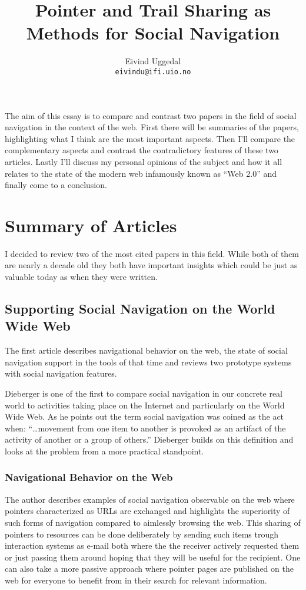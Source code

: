 \documentclass[12pt,a4paper]{article}
\title{Pointer and Trail Sharing as Methods for Social Navigation}
\author{Eivind Uggedal\\
  \texttt{eivindu@ifi.uio.no}}
\date{}
\begin{document}
\maketitle{}


The aim of this essay is to compare and contrast two papers in the field of
social navigation in the context of the web. First there will be summaries
of the papers, highlighting what I think are the most important aspects.
Then I'll compare the complementary aspects and contrast the contradictory
features of these two articles. Lastly I'll discuss my personal
opinions of the subject and how it all relates to the state of the modern web
infamously known as ``Web 2.0'' and finally come to a conclusion.

\section{Summary of Articles}

I decided to review two of the most cited papers in this field. While both of
them are nearly a decade old they both have important insights which could be
just as valuable today as when they were written.

\subsection{Supporting Social Navigation on the World Wide Web}
The first article \cite{dieberger97} describes navigational behavior on the
web, the state of social navigation support in the tools of that time and
reviews two prototype systems with social navigation features.

Dieberger is one of the first to compare social navigation in our concrete
real world to activities taking place on the Internet and particularly on the
World Wide Web. As he points out the term social navigation was coined as the
act when:
``\ldots movement from one item to another is provoked as an artifact of the
activity of another or a group of others.'' \cite{dourish94} Dieberger builds
on this definition and looks at the problem from a more practical standpoint.

\subsubsection{Navigational Behavior on the Web}

The author describes examples of social navigation observable on the web where
pointers characterized as URLs are exchanged and highlights the superiority of
such forms of navigation compared to aimlessly browsing the web. This sharing
of pointers to resources can be done deliberately by sending such
items trough interaction systems as e-mail both where the the receiver
actively requested them or just passing them around hoping that they
will be useful for the recipient. One can also take a more passive approach
where pointer pages are published on the web for everyone to benefit from in
their search for relevant information.
\end{document}
